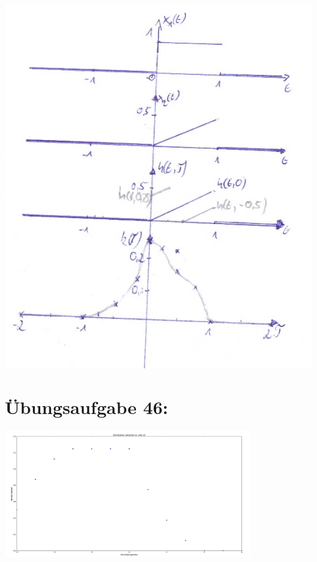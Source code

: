 	\includegraphics[angle=2]{A45_graph.png}
\newpage
	\section*{Übungsaufgabe 46:}

	\includegraphics[angle=90, width=0.8\textwidth]{A46.png}
	
\newpage